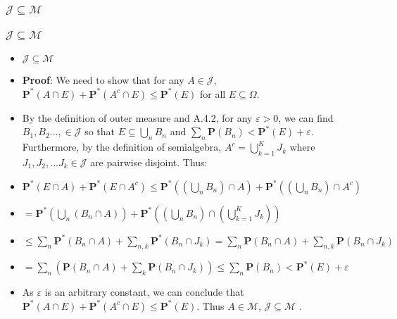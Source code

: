 \documentclass[handout]{beamer}
\newcommand{\BP}{\mathbf{P}}
\begin{document}
\subsubsection{$\mathcal{J} \subseteq \mathcal{M}$}
\frame
{
  \frametitle{$\mathcal{J} \subseteq \mathcal{M}$}

   \begin{itemize}

            \item<1->   [] \begin{Lemma} $\mathcal{J}\subseteq \mathcal{M}$ \end{Lemma}    
       
              \item<2-> []\textbf{Proof}: We need to show that for any $A\in \mathcal{J}$, $\BP^*(A\cap E)+\BP^*(A^c\cap E)\leq \BP^*(E)$ for all $E \subseteq \Omega$. 
              
                   \item<3->  By the definition of outer measure and A.4.2, for any $\varepsilon>0$, we can find $B_1, B_2 \ldots, \in\mathcal{J}$ so that $E\subseteq \bigcup_n B_n$ and $\sum_n \BP(B_n) < \BP^*(E)+\varepsilon$. Furthermore, by the definition of semialgebra, $A^c=\bigcup_{k=1}^K J_k$ where $J_1,J_2,\ldots J_k\in \mathcal{J} $ are pairwise disjoint. Thus: 
                                      \item<4->$ \BP^*(E\cap A)+\BP^*(E\cap A^c ) \leq \BP^*((\bigcup_n B_n)\cap A)+\BP^*((\bigcup_n B_n) \cap A^c) $
                                      \item<5->[] $=\BP^*( \bigcup_n (B_n \cap A) )+\BP^*((\bigcup_n B_n)\cap ( \bigcup_{k=1}^K J_k) )$ 
                                      \item<6->[]  $\leq \sum_n \BP^*( B_n \cap A)+\sum_{n,k}\BP^*(B_n \cap  J_k)=\sum_n \BP( B_n \cap A)+\sum_{n,k}\BP(B_n \cap  J_k) $
                                     \item<7->[]  $= \sum_n (\BP( B_n \cap A)+\sum_{k}\BP(B_n \cap  J_k) )\leq \sum_n \BP( B_n)  < \BP^*(E)+\varepsilon $
                                     \item<8-> As $\varepsilon$ is an arbitrary constant, we  can conclude that $\BP^*(A\cap E)+\BP^*(A^c\cap E)\leq \BP^*(E)$. Thus $A\in \mathcal{M}$, $\mathcal{J}\subseteq \mathcal{M}$ .
                                      

                   \end{itemize}
}
\end{document}
